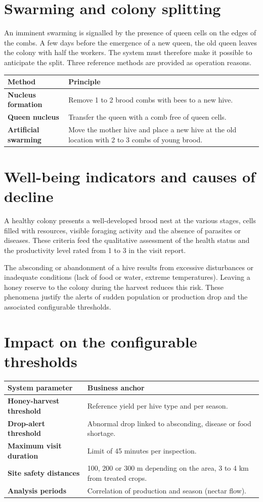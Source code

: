 \section{Swarming and colony splitting}
An imminent swarming is signalled by the presence of queen cells on the edges of
the combs. A few days before the emergence of a new queen, the old queen leaves
the colony with half the workers. The system must therefore make it possible to
anticipate the split. Three reference methods are provided as operation reasons.
\begin{xltabular}{\textwidth}{>{\bfseries}p{4.5cm} X}
\toprule
\textbf{Method} & \textbf{Principle} \\
\midrule
\endhead
Nucleus formation & Remove 1 to 2 brood combs with bees to a new hive. \\
Queen nucleus & Transfer the queen with a comb free of queen cells. \\
Artificial swarming & Move the mother hive and place a new hive at the old location with 2 to 3 combs of young brood. \\
\bottomrule
\end{xltabular}

\section{Well-being indicators and causes of decline}
A healthy colony presents a well-developed brood nest at the various stages,
cells filled with resources, visible foraging activity and the absence of
parasites or diseases. These criteria feed the qualitative assessment of the
health status and the productivity level rated from 1 to 3 in the visit report.

The absconding or abandonment of a hive results from excessive disturbances or
inadequate conditions (lack of food or water, extreme temperatures). Leaving a
honey reserve to the colony during the harvest reduces this risk. These
phenomena justify the alerts of sudden population or production drop and the
associated configurable thresholds.

\section{Impact on the configurable thresholds}
\begin{xltabular}{\textwidth}{>{\bfseries}p{4.5cm} X}
\toprule
\textbf{System parameter} & \textbf{Business anchor} \\
\midrule
\endhead
Honey-harvest threshold & Reference yield per hive type and per season. \\
Drop-alert threshold & Abnormal drop linked to absconding, disease or food shortage. \\
Maximum visit duration & Limit of 45 minutes per inspection. \\
Site safety distances & 100, 200 or 300 m depending on the area, 3 to 4 km from treated crops. \\
Analysis periods & Correlation of production and season (nectar flow). \\
\bottomrule
\end{xltabular}
